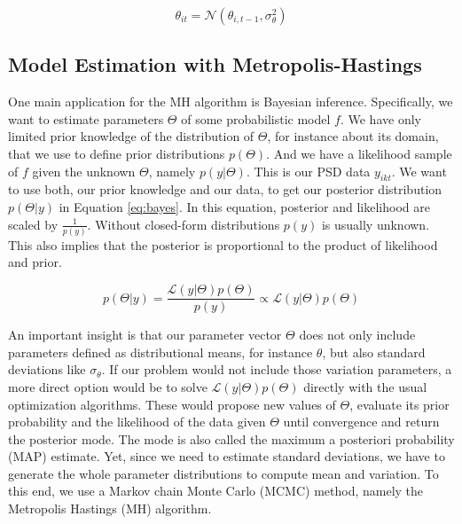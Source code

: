 \documentclass[12pt,english,a4paper,oneside]{article}
\theoremstyle{definition}
\theoremstyle{definition}
\theoremstyle{definition}
\theoremstyle{definition}
\theoremstyle{remark}
\begin{document}
\begin{equation}
\label{eq:dynamics}
\theta_{it} = \mathcal{N}(\theta_{i,t-1}, \sigma_{\theta}^2)
\end{equation}

\hypertarget{model-estimation-with-metropolis-hastings}{%
\subsection{Model Estimation with Metropolis-Hastings}\label{model-estimation-with-metropolis-hastings}}

One main application for the MH algorithm is Bayesian inference. Specifically, we want to estimate parameters \(\Theta\) of some probabilistic model \(f\). We have only limited prior knowledge of the distribution of \(\Theta\), for instance about its domain, that we use to define prior distributions \(p(\Theta)\). And we have a likelihood sample of \(f\) given the unknown \(\Theta\), namely \(p(y|\Theta)\). This is our PSD data \(y_{ikt}\). We want to use both, our prior knowledge and our data, to get our posterior distribution \(p(\Theta|y)\) in Equation \eqref{eq:bayes}. In this equation, posterior and likelihood are scaled by \(\frac{1}{p(y)}\). Without closed-form distributions \(p(y)\) is usually unknown. This also implies that the posterior is proportional to the product of likelihood and prior.

\begin{equation}
\label{eq:bayes}
p(\Theta|y) = \frac{\mathcal{L}(y|\Theta)p(\Theta)}{p(y)} \propto \mathcal{L}(y|\Theta)p(\Theta)
\end{equation}

\noindent
An important insight is that our parameter vector \(\Theta\) does not only include
parameters defined as distributional means, for instance \(\theta\), but also
standard deviations like \(\sigma_{\theta}\). If our problem would not include those
variation parameters, a more direct option would be to solve \(\mathcal{L}(y|\Theta)p(\Theta)\) directly with the usual optimization algorithms. These would
propose new values of \(\Theta\), evaluate its prior probability and the likelihood of
the data given \(\Theta\) until convergence and return the posterior mode. The mode is also called the maximum a posteriori probability (MAP) estimate. Yet, since we need to estimate standard deviations,
we have to generate the whole parameter distributions to compute mean and variation. To this end, we use a Markov chain Monte Carlo (MCMC) method, namely the Metropolis Hastings (MH) algorithm.
\end{document}
